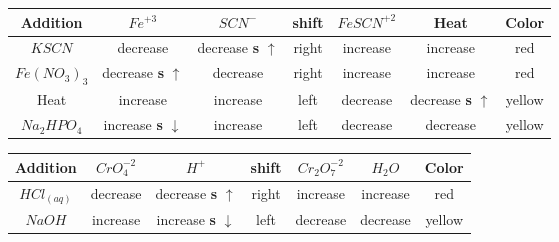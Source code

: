 \documentclass[12pt]{article}
\begin{document}
\vspace{0cm}
\begin{center}
\end{center}
\vspace{0cm}
\begin{adjustbox}{max width=50in,center}
  \begin{tabular}{|c|c|c|c|c|c|c|}
    \hline 
    Addition&$Fe^{+3}$&$SCN^-$&shift&$FeSCN^{+2}$&Heat&Color\\
    \hline
    $KSCN$&decrease&decrease \textbf s $\uparrow$&right&increase&increase&red\\
    \hline
    $Fe(NO_3)_3$&decrease \textbf s $\uparrow$& decrease&right&increase&increase&red\\
    \hline
    Heat&increase&increase&left&decrease&decrease \textbf s $\uparrow$&yellow\\
    \hline
    $Na_2HPO_4$&increase \textbf s $\downarrow$&increase&left&decrease&decrease&yellow\\
    \hline
    \end{tabular}
\end{adjustbox}
\vspace{0cm}

\begin{center}

\end{center}
\vspace{0cm}
\begin{adjustbox}{max width=50in,center}
  \begin{tabular}{|c|c|c|c|c|c|c|}
    \hline
    Addition & $CrO_4^{-2}$ & $H^+$ & shift & $Cr_2O_7^{-2}$&$H_2O$& Color\\
    \hline
    $HCl_{(aq)}$ &decrease&decrease \textbf s $\uparrow$&right&increase&increase&red\\
    \hline
    $NaOH$&increase&increase \textbf s $\downarrow$&left&decrease&decrease&yellow\\
    \hline
    
  \end{tabular}
  
\end{adjustbox}
\newpage
\end{document}
